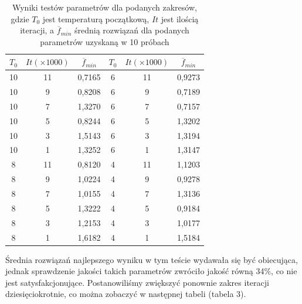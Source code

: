 \documentclass[twoside]{projektInzynierskiMS1}
\newcommand{\si}{ś}
\begin{document}
\begin{table}[htbp]\centering
\def\sym#1{\ifmmode^{#1}\else\(^{#1}\)\fi}
\caption{Wyniki testów parametrów dla podanych zakresów, gdzie $T_0$ jest temperaturą początkową, $It$ jest ilo\si cią iteracji, a $\overline{f}_{min}$ \si rednią rozwiązań dla podanych parametrów uzyskaną w 10 próbach}
\begin{tabular}{|c|c|c||c|c|c|} 
                  \hline
                  $T_0$
                  & $It (\times 1000)$
                  & $\overline{f}_{min}$ 
& $T_0$
 & $It (\times 1000)$
 & $\overline{f}_{min}$ \\ \hline


10 & 11 & 0,7165&6 & 11 & 0,9273 \\ \hline 
10 & 9 & 0,8208 &6 & 9 & 0,7189 \\ \hline 
10 & 7 & 1,3270 &6 & 7 & 0,7157 \\ \hline 
10 & 5 & 0,8244 &6 & 5 & 1,3202 \\ \hline  
10 & 3 & 1,5143 &6 & 3 & 1,3194 \\ \hline 
10 & 1 & 1,3252 &6 & 1 & 1,3147 \\ \Xhline{3\arrayrulewidth}

8 & 11 & 0,8120 &4 & 11 & 1,1203 \\ \hline 
8 & 9 & 1,0224 &4 & 9 & 0,9278 \\ \hline 
8 & 7 & 1,0155 &4 & 7 & 1,3136 \\ \hline 
8 & 5 & 1,3222 &4 & 5 & 0,9184 \\ \hline
8 & 3 & 1,2153 &4 & 3 & 1,0177 \\ \hline 
8 & 1 & 1,6182 &4 & 1 & 1,5184 \\ \hline

\end{tabular} 
\end{table}

Średnia rozwiązań najlepszego wyniku w tym te\si cie wydawała się być obiecująca, jednak sprawdzenie jako\si ci takich parametrów zwróciło jako\si ć równą 34\%, co nie jest satysfakcjonujące. Postanowili\si my zwiększyć ponownie zakres iteracji dziesięciokrotnie, co można zobaczyć w następnej tabeli (tabela 3). \\

\clearpage
\end{document}
